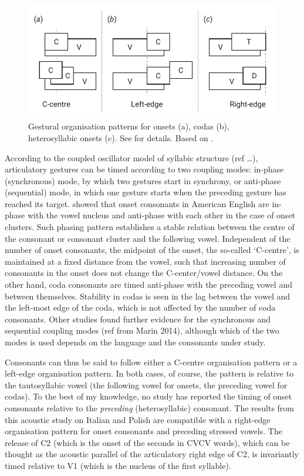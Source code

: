 \documentclass[preprint]{JASAnew}
\begin{document}
\label{s:gestural}

\begin{figure}
  \centering
  \includegraphics{img/gorganisation.pdf}
  \caption{Gestural organisation patterns for onsets (a), codas (b), heterosyllabic onsets (c). See  for details. Based on \citet{marin2010}.}
  \label{f:gorganisation}
\end{figure}

According to the coupled oscillator model of syllabic structure (ref
\ldots{}), articulatory gestures can be timed according to two coupling
modes: in-phase (synchronous) mode, by which two gestures start in
synchrony, or anti-phase (sequential) mode, in which one gesture starts
when the preceding gesture has reached its target. \citet{marin2010}
showed that onset consonants in American English are in-phase with the
vowel nucleus and anti-phase with each other in the case of onset
clusters. Such phasing pattern establishes a stable relation between the
centre of the consonant or consonant cluster and the following vowel.
Independent of the number of onset consonants, the midpoint of the
onset, the so-called `C-centre', is maintained at a fixed distance from
the vowel, such that increasing number of consonants in the onset does
not change the C-center/vowel distance. On the other hand, coda
consonants are timed anti-phase with the preceding vowel and between
themselves. Stability in codas is seen in the lag between the vowel and
the left-most edge of the coda, which is not affected by the number of
coda consonants. Other studies found further evidence for the
synchronous and sequential coupling modes (ref from Marin 2014),
although which of the two modes is used depends on the language and the
consonants under study.

Consonants can thus be said to follow either a C-centre organisation
pattern or a left-edge organisation pattern. In both cases, of course,
the pattern is relative to the tautosyllabic vowel (the following vowel
for onsets, the preceding vowel for codas). To the best of my knowledge,
no study has reported the timing of onset consonants relative to the
\emph{preceding} (heterosyllabic) consonant. The results from this
acoustic study on Italian and Polish are compatible with a right-edge
organisation pattern for onset consonants and preceding stressed vowels.
The release of C2 (which is the onset of the seconds in CVCV words),
which can be thought as the acoustic parallel of the articulatory right
edge of C2, is invariantly timed relative to V1 (which is the nucleus of
the first syllable).
\end{document}

